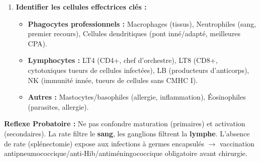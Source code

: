 \documentclass[11pt]{article}
\begin{document}
\begin{methode}
\begin{enumerate}
\begin{itemize}
\begin{itemize}
                \end{itemize}
        \end{itemize}
        \item \textbf{Identifier les cellules effectrices clés :}
        \begin{itemize}
            \item \textbf{Phagocytes professionnels :} Macrophages (tissus), Neutrophiles (sang, premier recours), Cellules dendritiques (pont inné/adapté, meilleures CPA).
            \item \textbf{Lymphocytes :} LT4 (CD4+, chef d'orchestre), LT8 (CD8+, cytotoxiques tueurs de cellules infectées), LB (producteurs d'anticorps), NK (immunité innée, tueurs de cellules sans CMHC I).
            \item \textbf{Autres :} Mastocytes/basophiles (allergie, inflammation), Éosinophiles (parasites, allergie).
        \end{itemize}
    \end{enumerate}
    \textbf{Reflexe Probatoire :} Ne pas confondre \og maturation \fg (primaires) et \og activation \fg (secondaires). La rate filtre le \textbf{sang}, les ganglions filtrent la \textbf{lymphe}. L'absence de rate (splénectomie) expose aux infections à germes encapsulés $\rightarrow$ vaccination antipneumococcique/anti-Hib/antiméningococcique obligatoire avant chirurgie.
\end{methode}
\end{document}
